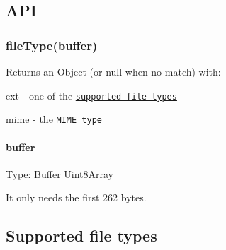 \subsection*{A\+PI}

\subsubsection*{file\+Type(buffer)}

Returns an {\ttfamily Object} (or {\ttfamily null} when no match) with\+:


\begin{DoxyItemize}
\item {\ttfamily ext} -\/ one of the \href{#supported-file-types}{\tt supported file types}
\item {\ttfamily mime} -\/ the \href{http://en.wikipedia.org/wiki/Internet_media_type}{\tt M\+I\+ME type}
\end{DoxyItemize}

\paragraph*{buffer}

Type\+: {\ttfamily Buffer} {\ttfamily Uint8\+Array}

It only needs the first 262 bytes.

\subsection*{Supported file types}


